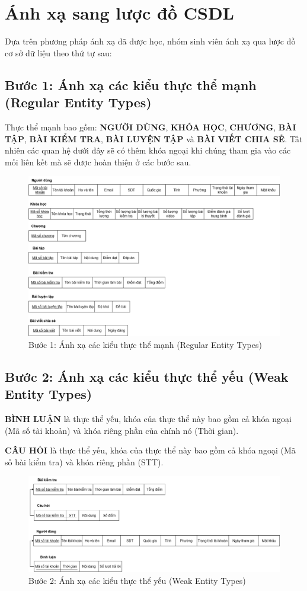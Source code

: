 \section{Ánh xạ sang lược đồ CSDL}
Dựa trên phương pháp ánh xạ đã được học, nhóm sinh viên ánh xạ qua lược đồ cơ sở dữ liệu theo thứ tự sau:

\subsection{Bước 1: Ánh xạ các kiểu thực thể mạnh (Regular Entity Types)}
Thực thể mạnh bao gồm: \textbf{NGƯỜI DÙNG}, \textbf{KHÓA HỌC}, \textbf{CHƯƠNG}, \textbf{BÀI TẬP}, \textbf{BÀI KIỂM TRA}, \textbf{BÀI LUYỆN TẬP} và \textbf{BÀI VIẾT CHIA SẺ}. Tất nhiên các quan hệ dưới đây sẽ có thêm khóa ngoại khi chúng tham gia vào các mối liên kết mà sẽ được hoàn thiện ở các bước sau.
\begin{figure}[H]
    \centering
    \includegraphics[width=1\linewidth]{picture/TTmanh.png}
    \caption{Bước 1: Ánh xạ các kiểu thực thể mạnh (Regular Entity Types)}
    \label{fig:placeholder}
\end{figure}
\subsection{Bước 2: Ánh xạ các kiểu thực thể yếu (Weak Entity Types)}
\textbf{BÌNH LUẬN} là thực thể yếu, khóa của thực thể này bao gồm cả khóa ngoại (Mã số tài khoản) và khóa riêng phần của chính nó (Thời gian).

\textbf{CÂU HỎI} là thực thể yếu, khóa của thực thể này bao gồm cả khóa ngoại (Mã số bài kiểm tra) và khóa riêng phần (STT).
\begin{figure}[H]
    \centering
    \includegraphics[width=1\linewidth]{picture/TTyeu.png}
    \caption{Bước 2: Ánh xạ các kiểu thực thể yếu (Weak Entity Types)}
    \label{fig:placeholder}
\end{figure}
\vspace{-20pt}
